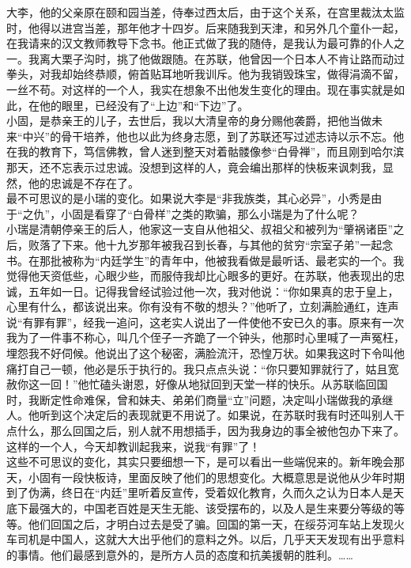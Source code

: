 大李，他的父亲原在颐和园当差，侍奉过西太后，由于这个关系，在宫里裁汰太监时，他得以进宫当差，那年他才十四岁。后来随我到天津，和另外几个童仆一起，在我请来的汉文教师教导下念书。他正式做了我的随侍，是我认为最可靠的仆人之一。我离大栗子沟时，挑了他做跟随。在苏联，他曾因一个日本人不肯让路而动过拳头，对我却始终恭顺，俯首贴耳地听我训斥。他为我销毁珠宝，做得涓滴不留，一丝不苟。对这样的一个人，我实在想象不出他发生变化的理由。现在事实就是如此，在他的眼里，已经没有了“上边”和“下边”了。\\

小固，是恭亲王的儿子，去世后，我以大清皇帝的身分赐他袭爵，把他当做未来“中兴”的骨干培养，他也以此为终身志愿，到了苏联还写过述志诗以示不忘。他在我的教育下，笃信佛教，曾人迷到整天对着骷髅像参“白骨禅”，而且刚到哈尔滨那天，还不忘表示过忠诚。没想到这样的人，竟会编出那样的快板来讽刺我，显然，他的忠诚是不存在了。\\

最不可思议的是小瑞的变化。如果说大李是“非我族类，其心必异”，小秀是由于“之仇”，小固是看穿了“白骨样”之类的欺骗，那么小瑞是为了什么呢？\\

小瑞是清朝停亲王的后人，他家这一支自从他祖父、叔祖父和被列为“肇祸诸臣”之后，败落了下来。他十九岁那年被我召到长春，与其他的贫穷“宗室子弟”一起念书。在那批被称为“内廷学生”的青年中，他被我看做是最听话、最老实的一个。我觉得他天资低些，心眼少些，而服侍我却比心眼多的更好。在苏联，他表现出的忠诚，五年如一日。记得我曾经试验过他一次，我对他说：“你如果真的忠于皇上，心里有什么，都该说出来。你有没有不敬的想头？”他听了，立刻满脸通红，连声说“有罪有罪”，经我一追问，这老实人说出了一件使他不安已久的事。原来有一次我为了一件事不称心，叫几个侄子一齐跪了一个钟头，他那时心里喊了一声冤枉，埋怨我不好伺候。他说出了这个秘密，满脸流汗，恐惶万状。如果我这时下令叫他痛打自己一顿，他必是乐于执行的。我只点点头说：“你只要知罪就行了，姑且宽赦你这一回！”他忙磕头谢恩，好像从地狱回到天堂一样的快乐。从苏联临回国时，我断定性命难保，曾和妹夫、弟弟们商量“立”问题，决定叫小瑞做我的承继人。他听到这个决定后的表现就更不用说了。如果说，在苏联时我有时还叫别人干点什么，那么回国之后，别人就不用想插手，因为我身边的事全被他包办下来了。这样的一个人，今天却教训起我来，说我“有罪”了！\\

这些不可思议的变化，其实只要细想一下，是可以看出一些端倪来的。新年晚会那天，小固有一段快板诗，里面反映了他们的思想变化。大概意思是说他从少年时期到了伪满，终日在“内廷”里听着反宣传，受着奴化教育，久而久之认为日本人是天底下最强大的，中国老百姓是天生无能、该受摆布的，以及人是生来要分等级的等等。他们回国之后，才明白过去是受了骗。回国的第一天，在绥芬河车站上发现火车司机是中国人，这就大大出乎他们的意料之外。以后，几乎天天发现有出乎意料的事情。他们最感到意外的，是所方人员的态度和抗美援朝的胜利。……\\

